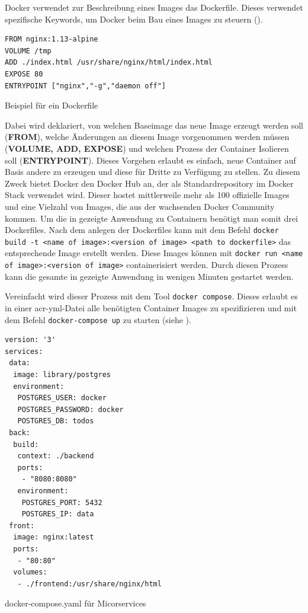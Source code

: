 Docker verwendet zur Beschreibung eines Images das Dockerfile. Dieses verwendet spezifische Keywords, um Docker beim Bau eines Images zu steuern ().

\begin{listing}[h]
	\begin{verbatim}
FROM nginx:1.13-alpine
VOLUME /tmp
ADD ./index.html /usr/share/nginx/html/index.html
EXPOSE 80
ENTRYPOINT ["nginx","-g","daemon off"]
	\end{verbatim}
	\caption{Beispiel für ein Dockerfile}
	\label{lst:dockerfileExmpl}
\end{listing}

Dabei wird deklariert, von welchen Baseimage das neue Image erzeugt werden soll (\textbf{FROM}), welche Änderungen an diesem Image vorgenommen werden müssen (\textbf{VOLUME, ADD, EXPOSE}) und welchen Prozess der Container Isolieren soll (\textbf{ENTRYPOINT}). Dieses Vorgehen erlaubt es einfach, neue Container auf Basis andere zu erzeugen und diese für Dritte zu Verfügung zu stellen. Zu diesem Zweck bietet Docker den Docker Hub an, der als Standardrepository im Docker Stack verwendet wird. Dieser hostet mittlerweile mehr als 100 offizielle Images und eine Vielzahl von Images, die aus der wachsenden Docker Community kommen. Um die in  gezeigte Anwendung zu Containern benötigt man somit drei Dockerfiles. Nach dem anlegen der Dockerfiles kann mit dem Befehl \texttt{docker build -t <name of image>:<version of image> <path to dockerfile>} das entsprechende Image erstellt werden. Diese Images können mit \texttt{docker run <name of image>:<version of image>} containerisiert werden. Durch diesen Prozess kann die gesamte in  gezeigte Anwendung in wenigen Minuten gestartet werden.

Vereinfacht wird dieser Prozess mit dem Tool \texttt{docker compose}. Dieses erlaubt es in einer \gls{acr-yml}-Datei alle benötigten Container Images zu spezifizieren und mit dem Befehl \texttt{docker-compose up} zu starten (siehe ).

\begin{listing}[h]
	\begin{verbatim}
version: '3'
services:
 data:
  image: library/postgres
  environment:
   POSTGRES_USER: docker
   POSTGRES_PASSWORD: docker
   POSTGRES_DB: todos
 back:
  build:
   context: ./backend
   ports:
    - "8080:8080"
   environment:
    POSTGRES_PORT: 5432
    POSTGRES_IP: data
 front:
  image: nginx:latest
  ports:
   - "80:80"
  volumes:
   - ./frontend:/usr/share/nginx/html
	\end{verbatim}
	\caption{docker-compose.yaml für Micorservices}
	\label{lst:dockerComposeTodos}
\end{listing}

